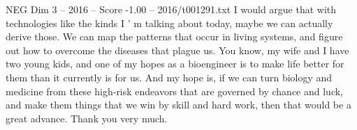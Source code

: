 \begin{textsample}{NEG Dim 3 – 2016 – Score -1.00 – 2016/t001291.txt}
I would argue that with technologies like the kinds I ' m talking about today, maybe we can actually derive those.
We can map the patterns that occur in living systems, and figure out how to overcome the diseases that plague us.
You know, my wife and I have two young kids, and one of my hopes as a bioengineer is to make life better for them than it currently is for us.
And my hope is, if we can turn biology and medicine from these high-risk endeavors that are governed by chance and luck, and make them things that we win by skill and hard work, then that would be a great advance.
Thank you very much.

\end{textsample}
